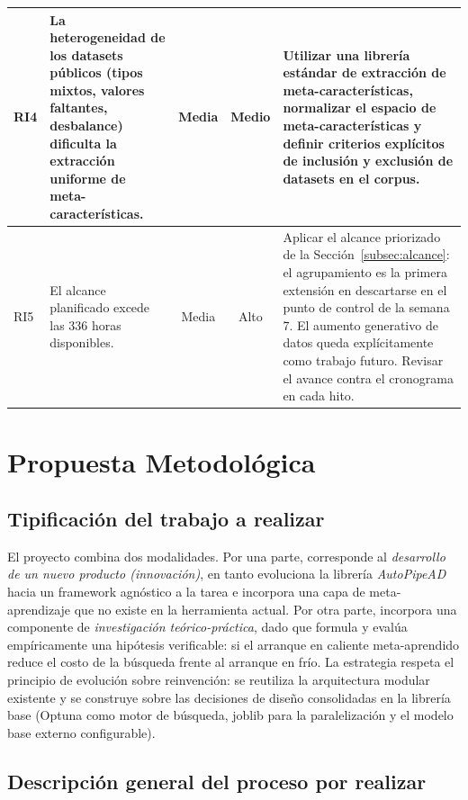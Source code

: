 \documentclass[12pt,letterpaper]{article}
\begin{document}
{\begin{longtable}{@{}p{0.6cm} >{\raggedright\arraybackslash}p{4.8cm} c c >{\raggedright\arraybackslash}p{5.2cm}@{}}
RI4 & La heterogeneidad de los datasets públicos (tipos mixtos, valores faltantes, desbalance) dificulta la extracción uniforme de meta-características. & Media & Medio & Utilizar una librería estándar de extracción de meta-características, normalizar el espacio de meta-características y definir criterios explícitos de inclusión y exclusión de datasets en el corpus. \\
\midrule

RI5 & El alcance planificado excede las 336 horas disponibles. & Media & Alto & Aplicar el alcance priorizado de la Sección~\ref{subsec:alcance}: el agrupamiento es la primera extensión en descartarse en el punto de control de la semana 7. El aumento generativo de datos queda explícitamente como trabajo futuro. Revisar el avance contra el cronograma en cada hito. \\

\end{longtable}
}

\section{Propuesta Metodológica}

\subsection{Tipificación del trabajo a realizar}

El proyecto combina dos modalidades. Por una parte, corresponde al \textit{desarrollo de un nuevo producto (innovación)}, en tanto evoluciona la librería \textit{AutoPipeAD} hacia un framework agnóstico a la tarea e incorpora una capa de meta-aprendizaje que no existe en la herramienta actual. Por otra parte, incorpora una componente de \textit{investigación teórico-práctica}, dado que formula y evalúa empíricamente una hipótesis verificable: si el arranque en caliente meta-aprendido reduce el costo de la búsqueda frente al arranque en frío. La estrategia respeta el principio de evolución sobre reinvención: se reutiliza la arquitectura modular existente y se construye sobre las decisiones de diseño consolidadas en la librería base (Optuna como motor de búsqueda, joblib para la paralelización y el modelo base externo configurable).

\subsection{Descripción general del proceso por realizar}
\end{document}
